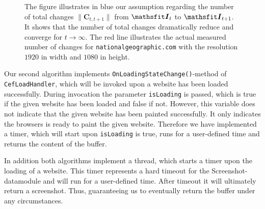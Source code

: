 \begin{figure}
	\centering
	
	\caption[Figure on total number of changes on a website]{The figure illustrates in blue our assumption regarding the number of total changes $\lVert \bm{C}_{t,t+1}\rVert$ from $\tens{I}_{t}$ to $\tens{I}_{t+1}$. It shows that the number of total changes dramatically reduce and converge for $t \rightarrow \infty$. The red line illustrates the actual measured number of changes for \texttt{nationalgeographic.com} with the resolution $1920$ in width and $1080$ in height. }
	\label{plot_assumption_number_changes}
\end{figure}

Our second algorithm implements \texttt{OnLoadingStateChange()}-method of \texttt{CefLoadHandler}, which will be invoked upon a website has been loaded successfully. During invocation the parameter \texttt{isLoading} is passed, which is true if the given website has been loaded and false if not. However, this variable does not indicate that the given website has been painted successfully. It only indicates the browsers is ready to paint the given website. Therefore we have implemented a timer, which will start upon \texttt{isLoading} is true, runs for a user-defined time and returns the content of the buffer.

In addition both algorithms implement a thread, which starts a timer upon the loading of a website. This timer represents a hard timeout for the Screenshot-datamodule and will run for a user-defined time. After timeout it will ultimately return a screenshot. Thus, guaranteeing us to eventually return the buffer under any circumstances.

